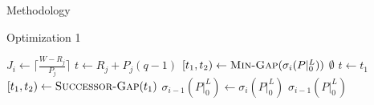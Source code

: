 \documentclass{article}
\begin{document}
\begin{section}{Methodology}
\begin{subsection}{Optimization 1}
    \begin{algorithm}
      \caption{Gap-Tranformation Algorithm Optimization 1: No Zero Gaps Reinserted}\label{gapxfrm2}
      \begin{algorithmic}[2]
          \State $J_{i} \gets \lceil\frac{W - R_{j}}{P_{j}}\rceil$
            \State $t \gets R_{j} + P_{j}(q-1)$
            \State $[t_{1},t_{2}) \gets \Call{Min-Gap}{\sigma_{i}(P|_{0}^{L})}$
            \While{$[t_{1},t_{2}) \not= \Call{Nil}{\sigma_{i}(P|_{0}^{L})}$}
                \State \Return $\emptyset$
              \EndIf
                \State $t \gets t_{1}$
              \EndIf
                \State \Call{Gap-Delete}{$\sigma_{i}(P|_{0}^{L}), [t_{1},t_{2})$}
                    \State \Call{Gap-Insert}{$\sigma_{i}(P|_{0}^{L}), [t_{1},t)$}
                  \NewEndIf
                  \ExitWhile
                \EndIf
                      \State \Call{Gap-Insert}{$\sigma_{i}(P|_{0}^{L}), [t_{1},t)$}
                    \NewEndIf
                  \State \Call{Gap-Insert}{$\sigma_{i}(P|_{0}^{L}), [t + C_{j},t_{2})$}
                  \ExitWhile
                \EndIf
                    \State \Call{Gap-Insert}{$\sigma_{i}(P|_{0}^{L}), [t_{1},t)$}
                  \NewEndIf
                \EndIf                  
              \EndIf
              \State $[t_{1},t_{2}) \gets \Call{Successor-Gap}{t_{1}}$
            \EndWhile
          \EndFor
          \State $\sigma_{i-1}(P|_{0}^{L}) \gets \sigma_{i}(P|_{0}^{L})$
          \State \Return $\sigma_{i-1}(P|_{0}^{L})$
        \EndFunction
      \end{algorithmic}
      \end{algorithm}
  \end{subsection}


\end{section}
\end{document}
